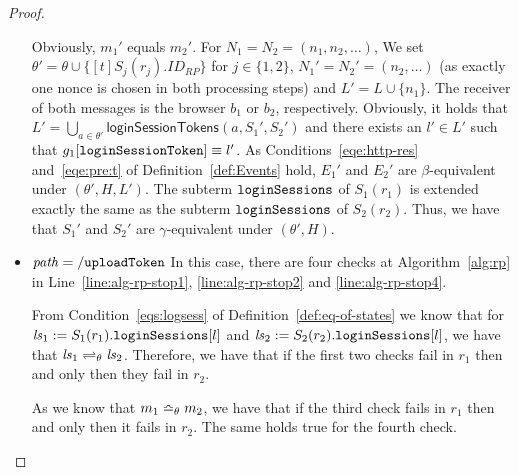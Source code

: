 \begin{theorem}
\begin{proof}
\begin{itemize}
        Obviously, $m_1'$ equals $m_2'$. For $N_1 = N_2 = 
        (n_1, n_2, \dots)$, We set $\theta' = \theta \cup 
        \{ [t]S_j(r_j).ID_{RP} \}$ for $j\in \{1, 2\}$, 
        $N_1' = N_2' = (n_2, \dots)$ (as exactly one nonce is 
        chosen in both processing steps) and 
        $L' = L \cup \{n_1\}$. 
        The receiver of both messages is the browser $b_1$ or 
        $b_2$, respectively. Obviously, it holds that
        $L' = \bigcup_{a\in\theta'} 
        \mathsf{loginSessionTokens}(a,S_1',S_2')$
        and there exists an $l' \in L'$ such that
        $g_1[\mathtt{loginSessionToken}] \equiv l'$. As
        Conditions~\ref{eqe:http-res} and~\ref{eqe:pre:t} of
        Definition~\ref{def:Events} hold, $E_1'$ and $E_2'$ are
        $\beta$-equivalent under $(\theta',H,L')$. The subterm
        $\mathtt{loginSessions}$ of $S_1(r_1)$ is extended exactly 
        the same as the subterm $\mathtt{loginSessions}$ of 
        $S_2(r_2)$. Thus, we have that $S_1'$ and $S_2'$ are
        $\gamma$-equivalent under $(\theta',H)$.
      \item $\mathit{path} = \mathtt{/uploadToken}$ In this case, 
        there are four checks at Algorithm~\ref{alg:rp} in
        Line~\ref{line:alg-rp-stop1}, %
        \ref{line:alg-rp-stop2} and \ref{line:alg-rp-stop4}.
        
        From Condition~\ref{eqs:logsess} of 
        Definition~\ref{def:eq-of-states} we know that for 
        $\mathit{ls}_1 := S_1(r_1).\mathtt{loginSessions}[l]$ and 
        $\mathit{ls}_2 := S_2(r_2).\mathtt{loginSessions}[l]$, 
        we have that $\mathit{ls}_1 \rightleftharpoons_{\theta} \mathit{ls}_2$.
        Therefore, we have that if the first two checks fail in
        $r_1$ then and only then they fail in $r_2$.
  
        As we know that $m_1 \bumpeq_{\theta} m_2$, we have 
        that if the third check fails in $r_1$ then and only 
        then it fails in $r_2$. The same holds true for the 
        fourth check.
  

\end{itemize}
\end{proof}
\end{theorem}
